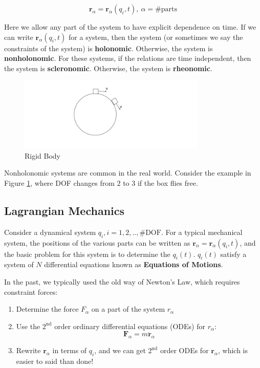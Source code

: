 \[
    \mathbf{r}_\alpha = \mathbf{r}_\alpha(q_i, t),\ \alpha=\text{\# parts}
\]

Here we allow any part of the system to have explicit dependence on time. If we can write $\mathbf{r}_\alpha(q_i, t)$ for a system, then the system (or sometimes we say the constraints of the system) is \textbf{holonomic}. Otherwise, the system is  \textbf{nonholonomic}. For these systems, if the relations are time independent, then the system is \textbf{scleronomic}. Otherwise, the system is \textbf{rheonomic}. 

\begin{figure}[ht]
  \centering
  \includegraphics[width=0.8\textwidth]{images/1-1-3.png}
  \caption{Rigid Body}
  \label{fig:1-1-3}
\end{figure}

Nonholonomic systems are common in the real world. Consider the example in Figure \ref{fig:1-1-3}, where DOF changes from $2$ to $3$ if the box flies free.

\subsection{Lagrangian Mechanics}

Consider a dynamical system $q_i, i=1,2,..,\text{\# DOF}$. For a typical mechanical system, the positions of the various parts can be written as $\mathbf{r}_\alpha=\mathbf{r}_\alpha(q_i, t)$, and the basic problem for this system is to determine the $q_i(t)$. $q_i(t)$ satisfy a system of $N$ differential equations known as \textbf{Equations of Motions}.

In the past, we typically used the old way of Newton's Law, which requires constraint forces:

\begin{enumerate}
    \item Determine the force $F_\alpha$ on a part of the system $r_\alpha$
    \item Use the $2^{\text{nd}}$ order ordinary differential equations (ODEs) for $r_\alpha$: 
    \[
        \mathbf{F}_\alpha = m \ddot{\mathbf{r}}_\alpha
    \]
    \item Rewrite $\mathbf{r}_\alpha$ in terms of $q_i$, and we can get $2^{\text{nd}}$ order ODEs for $\mathbf{r}_\alpha$, which is easier to said than done!
\end{enumerate}

